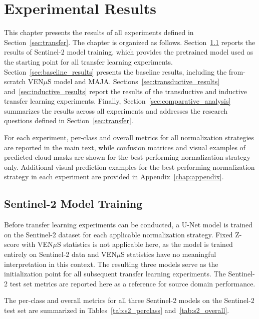\chapter{Experimental Results}
\label{chap:experiments}

This chapter presents the results of all experiments defined in Section~\ref{sec:transfer}. The chapter is organized as follows. Section~\ref{sec:s2_training} reports the results of Sentinel-2 model training, which provides the pretrained model used as the starting point for all transfer learning experiments. Section~\ref{sec:baseline_results} presents the baseline results, including the from-scratch VEN$\mu$S model and MAJA. Sections~\ref{sec:transductive_results} and~\ref{sec:inductive_results} report the results of the transductive and inductive transfer learning experiments. Finally, Section~\ref{sec:comparative_analysis} summarizes the results across all experiments and addresses the research questions defined in Section~\ref{sec:transfer}. 

For each experiment, per-class and overall metrics for all normalization strategies are reported in the main text, while confusion matrices and visual examples of predicted cloud masks are shown for the best performing normalization strategy only. Additional visual prediction examples for the best performing normalization strategy in each experiment are provided in Appendix~\ref{chap:appendix}.

\section{Sentinel-2 Model Training}
\label{sec:s2_training}

Before transfer learning experiments can be conducted, a U-Net model is trained on the Sentinel-2 dataset for each applicable normalization strategy. Fixed Z-score with VEN$\mu$S statistics is not applicable here, as the model is trained entirely on Sentinel-2 data and VEN$\mu$S statistics have no meaningful interpretation in this context. The resulting three models serve as the initialization point for all subsequent transfer learning experiments. The Sentinel-2 test set metrics are reported here as a reference for source domain performance.

The per-class and overall metrics for all three Sentinel-2 models on the Sentinel-2 test set are summarized in Tables~\ref{tab:s2_perclass} and~\ref{tab:s2_overall}.

